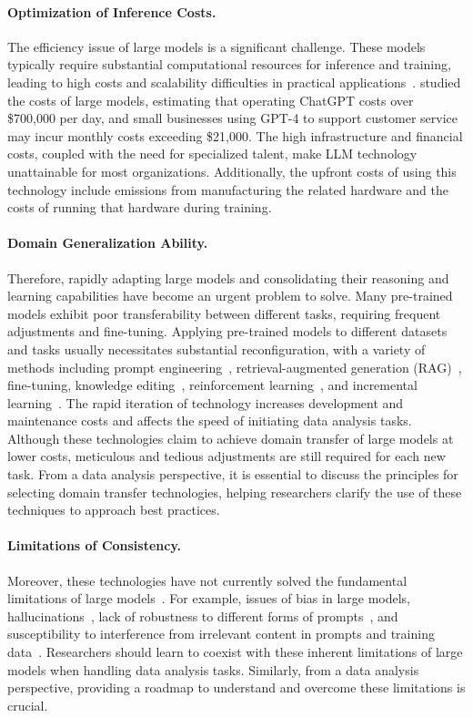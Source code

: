   \paragraph{Optimization of Inference Costs.} The efficiency issue of large models is a significant challenge. These models typically require substantial computational resources for inference and training, leading to high costs and scalability difficulties in practical applications~\cite{041zhai2022scaling}. \cite{chow2024performance} studied the costs of large models, estimating that operating ChatGPT costs over \$700,000 per day, and small businesses using GPT-4 to support customer service may incur monthly costs exceeding \$21,000. The high infrastructure and financial costs, coupled with the need for specialized talent, make LLM technology unattainable for most organizations. Additionally, the upfront costs of using this technology include emissions from manufacturing the related hardware and the costs of running that hardware during training.
  
  \paragraph{Domain Generalization Ability.} Therefore, rapidly adapting large models and consolidating their reasoning and learning capabilities have become an urgent problem to solve. Many pre-trained models exhibit poor transferability between different tasks, requiring frequent adjustments and fine-tuning. Applying pre-trained models to different datasets and tasks usually necessitates substantial reconfiguration, with a variety of methods including prompt engineering~\cite{sordoni2024joint}, retrieval-augmented generation (RAG)~\cite{gao2023retrieval}, fine-tuning, knowledge editing~\cite{Wang2023KnowledgeEF}, reinforcement learning~\cite{Kaufmann2023ASO}, and incremental learning~\cite{wu2024continual}. The rapid iteration of technology increases development and maintenance costs and affects the speed of initiating data analysis tasks. Although these technologies claim to achieve domain transfer of large models at lower costs, meticulous and tedious adjustments are still required for each new task. From a data analysis perspective, it is essential to discuss the principles for selecting domain transfer technologies, helping researchers clarify the use of these techniques to approach best practices.
  
  \paragraph{Limitations of Consistency.} Moreover, these technologies have not currently solved the fundamental limitations of large models~\cite{bender2021dangers}. For example, issues of bias in large models, hallucinations~\cite{Ji2022SurveyOH}, lack of robustness to different forms of prompts~\cite{Lu2021FantasticallyOP}, and susceptibility to interference from irrelevant content in prompts and training data~\cite{Shi2023LargeLM}. Researchers should learn to coexist with these inherent limitations of large models when handling data analysis tasks. Similarly, from a data analysis perspective, providing a roadmap to understand and overcome these limitations is crucial.
  
